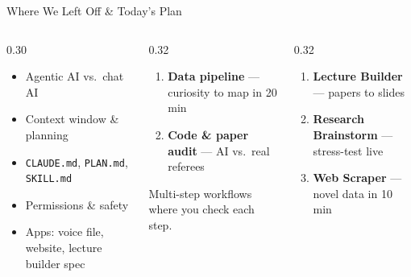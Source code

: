 \documentclass[aspectratio=169, 10pt]{beamer}
\begin{document}
\begin{frame}{Where We Left Off \& Today's Plan}
\begin{columns}[T]
\begin{column}{0.30\textwidth}
\begin{tcolorbox}[keybox, title={\faHistory\quad Session 1}]
\scriptsize
\begin{itemize}\setlength{\itemsep}{2pt}
  \item Agentic AI vs.\ chat AI
  \item Context window \& planning
  \item \texttt{CLAUDE.md}, \texttt{PLAN.md}, \texttt{SKILL.md}
  \item Permissions \& safety
  \item Apps: voice file, website, lecture builder spec
\end{itemize}
\end{tcolorbox}
\end{column}
\begin{column}{0.32\textwidth}
\begin{tcolorbox}[keybox, title={\faFlask\quad Emily: Research}]
\scriptsize
\begin{enumerate}\setlength{\itemsep}{2pt}
  \item \textbf{Data pipeline} --- curiosity to map in 20 min
  \item \textbf{Code \& paper audit} --- AI vs.\ real referees
\end{enumerate}
\vskip3pt
{\tiny\color{CoolGray} Multi-step workflows where you check each step.}
\end{tcolorbox}
\end{column}
\begin{column}{0.32\textwidth}
\begin{tcolorbox}[keybox, title={\faRocket\quad Erkmen: Teaching}]
\scriptsize
\begin{enumerate}\setlength{\itemsep}{2pt}
  \item \textbf{Lecture Builder} --- papers to slides
  \item \textbf{Research Brainstorm} --- stress-test live
  \item \textbf{Web Scraper} --- novel data in 10 min
\end{enumerate}
\end{tcolorbox}
\end{column}
\end{columns}
\end{frame}
\end{document}

